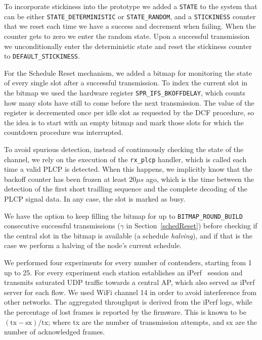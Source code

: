 To incorporate stickiness into the prototype we added a {\tt STATE} to the system that can be either {\tt STATE\_DETERMINISTIC} or {\tt STATE\_RANDOM}, and a {\tt STICKINESS} counter that we reset each time we have a success and decrement when failing. When the counter gets to zero we enter the random state. Upon a successful transmission we unconditionally enter the deterministic state and reset the stickiness counter to {\tt DEFAULT\_STICKINESS}.

For the Schedule Reset mechanism, we added a bitmap for monitoring the state of every single slot after a successful transmission. To index the current slot in the bitmap we used the hardware register {\tt SPR\_IFS\_BKOFFDELAY}, which counts how many slots have still to come before the next transmission. The value of the register is decremented once per idle slot as requested by the DCF procedure, so the idea is to start with an empty bitmap and mark those slots for which the countdown procedure was interrupted. 

To avoid spurious detection, instead of continuously checking the state of the channel, we rely on the execution of the {\tt rx\_plcp} handler, which is called each time a valid PLCP is detected. When this happens, we implicitly know that the backoff counter has been frozen at least $20\mu s$ ago, which is the time between the detection of the first short trailling sequence and the complete decoding of the PLCP signal data. In any case, the slot is marked as busy.

We have the option to keep filling the bitmap for up to {\tt BITMAP\_ROUND\_BUILD} consecutive successful transmissions ($\gamma$ in Section~\ref{schedReset}) before checking if the central slot in the bitmap is available (a schedule \emph{halving}), and if that is the case we perform a halving of the node's current schedule.

We performed four experiments for every number of contenders, starting from 1 up to 25. For every experiment each station establishes an iPerf~\cite{tirumala2005iperf} session and transmits saturated UDP traffic towards a central AP, which also served as iPerf server for each flow. We used WiFi channel 14  in order to avoid interference from other networks. The aggregated throughput is derived from the iPerf logs, while the percentage of lost frames is reported by the firmware. This is known to be $(\text{tx}-\text{sx})/\text{tx}$; where tx are the number of transmission attempts, and sx are the number of acknowledged frames.

